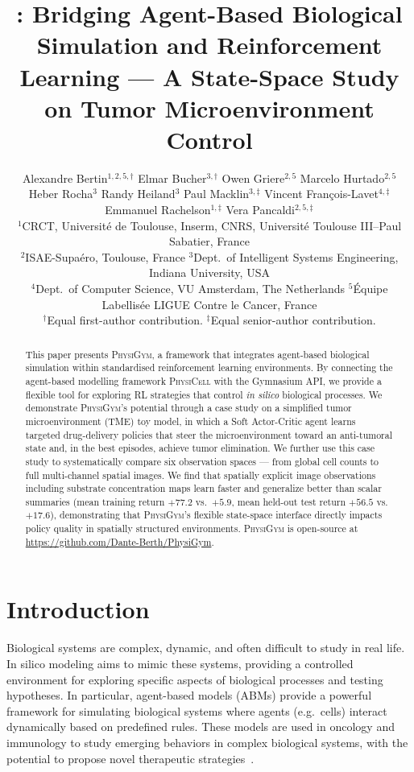 \documentclass{article}
\title{\physigym{}: Bridging Agent-Based Biological Simulation and Reinforcement
  Learning — A State-Space Study on Tumor Microenvironment Control}
\author{%
  Alexandre Bertin$^{1,2,5,\dagger}$ \quad
  Elmar Bucher$^{3,\dagger}$ \quad
  Owen Griere$^{2,5}$ \quad
  Marcelo Hurtado$^{2,5}$ \\
  Heber Rocha$^{3}$ \quad
  Randy Heiland$^{3}$ \quad
  Paul Macklin$^{3,\ddagger}$ \quad
  Vincent Fran\c{c}ois-Lavet$^{4,\ddagger}$ \\
  Emmanuel Rachelson$^{1,\ddagger}$ \quad
  Vera Pancaldi$^{2,5,\ddagger}$ \\[4pt]
  $^1$CRCT, Université de Toulouse, Inserm, CNRS, Université Toulouse III--Paul Sabatier, France \\
  $^2$ISAE-Supaéro, Toulouse, France \quad
  $^3$Dept.\ of Intelligent Systems Engineering, Indiana University, USA \\
  $^4$Dept.\ of Computer Science, VU Amsterdam, The Netherlands \quad
  $^5$Équipe Labellisée LIGUE Contre le Cancer, France \\[2pt]
  {\small $^\dagger$Equal first-author contribution. $^\ddagger$Equal senior-author contribution.}
}
\newcommand{\physigym}{\textsc{PhysiGym}}
\newcommand{\physicell}{\textsc{PhysiCell}}
\begin{document}
\maketitle

\begin{abstract}
This paper presents \physigym{}, a framework that integrates agent-based
biological simulation within standardised reinforcement learning environments.
By connecting the agent-based modelling framework \physicell{} with the
Gymnasium API, we provide a flexible tool for exploring RL strategies that
control \emph{in silico} biological processes.
We demonstrate \physigym{}'s potential through a case study on a simplified
tumor microenvironment (TME) toy model, in which a Soft Actor-Critic agent
learns targeted drug-delivery policies that steer the microenvironment toward an
anti-tumoral state and, in the best episodes, achieve tumor elimination.
We further use this case study to systematically compare six observation
spaces — from global cell counts to full multi-channel spatial images.
We find that spatially explicit image observations including substrate
concentration maps learn faster and generalize better than scalar summaries
(mean training return $+77.2$ vs.\ $+5.9$, mean held-out test return
$+56.5$ vs.\ $+17.6$), demonstrating that \physigym{}'s flexible state-space
interface directly impacts policy quality in spatially structured environments.
\physigym{} is open-source at \url{https://github.com/Dante-Berth/PhysiGym}.
\end{abstract}

\section{Introduction}

Biological systems are complex, dynamic, and often difficult to study in real
life.
In silico modeling aims to mimic these systems, providing a controlled
environment for exploring specific aspects of biological processes and testing
hypotheses.
In particular, agent-based models (ABMs) provide a powerful framework for
simulating biological systems where agents (e.g.\ cells) interact dynamically
based on predefined rules. These models are used in oncology and immunology to
study emerging behaviors in complex biological systems, with the potential to
propose novel therapeutic strategies~\citep{johnson2023digitize,
laubenbacher2024toward, rocha2024multiscale}.
\end{document}
